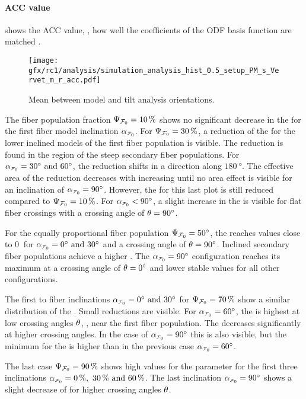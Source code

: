 \paragraph{\acs{ACC} value}
% 
 shows the  \ac{ACC} value, \ie{}, how well the coefficients of the \ac{ODF} basis function are matched \cite{Schilling2018}.
\par
%
\begin{figure}[!p]
\centering
\texttt{[image: gfx/rc1/analysis/simulation\_analysis\_hist\_0.5\_setup\_PM\_s\_Vervet\_m\_r\_acc.pdf]}
\caption{Mean \accvalue{} between model and tilt analysis orientations.}
\label{fig:sim_ana_acc}
\end{figure}
% 
The fiber population fraction $\textnormal{$\Psi_{\textnormal{$\mathcal{F}_0$}}$}=\SI{10}{\percent}$ shows no significant decrease in the \accvalue{} for the first fiber model inclination $\modelInc$.
For $\textnormal{$\Psi_{\textnormal{$\mathcal{F}_0$}}$}=\SI{30}{\percent}$, a reduction of the \accvalue{} for the lower inclined models of the first fiber population is visible.
The reduction is found in the region of the steep secondary fiber populations.
For $\modelInc = \SIlist{30;60}{\degree}$, the reduction shifts in a direction along $\SI{180}{\degree}$.
The effective area of the reduction decreases with increasing \modelInc{} until no area effect is visible for an inclination of $\modelInc=\SI{90}{\degree}$.
However, the \accvalue{} for this last plot is still reduced compared to $\textnormal{$\Psi_{\textnormal{$\mathcal{F}_0$}}$}=\SI{10}{\percent}$.
For $\modelInc < \SI{90}{\degree}$, a slight increase in the \accvalue{} is visible for flat fiber crossings with a crossing angle of $\textnormal{$\theta$}=\SI{90}{\degree}$.
\par
%
For the equally proportional fiber population $\textnormal{$\Psi_{\textnormal{$\mathcal{F}_0$}}$} = \SI{50}{\degree}$, the \accvalue{} reaches values close to $\SI{0}{}$ for $\modelInc = \SIlist{0;30}{\degree}$ and a crossing angle of $\textnormal{$\theta$}=\SI{90}{\degree}$.
Inclined secondary fiber populations achieve a higher \accvalue{}.
The $\modelInc = \SI{90}{\degree}$ configuration reaches its maximum \accvalue{} at a crossing angle of $\textnormal{$\theta$}=\SI{0}{\degree}$ and lower stable values for all other configurations.
\par
%
The first to fiber inclinations $\modelInc = \SIlist{0;30}{\degree}$ for $\textnormal{$\Psi_{\textnormal{$\mathcal{F}_0$}}$}=\SI{70}{\percent}$ show a similar distribution of the \accvalue{}. 
Small reductions are visible.
For $\modelInc=\SI{60}{\degree}$, the \accvalue{} is highest at low crossing angles $\textnormal{$\theta$}$, \ie{}, near the first fiber population.
The \accvalue{} decreases significantly at higher crossing angles.
In the case of $\modelInc=\SI{90}{\degree}$ this is also visible, but the minimum for the \accvalue{} is higher than in the previous case $\modelInc=\SI{60}{\degree}$.
\par
%
The last case $\textnormal{$\Psi_{\textnormal{$\mathcal{F}_0$}}$}=\SI{90}{\percent}$ shows high values for the \accvalue{} parameter for the first three inclinations $\modelInc=\SIlist{0;30;60}{\percent}$.
The last inclination $\modelInc=\SI{90}{\degree}$ shows a slight decrease of \accvalue{} for higher crossing angles $\textnormal{$\theta$}$.
%
% 
% 
